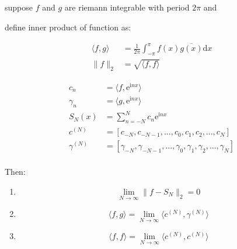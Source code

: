 \begin{thm}
    suppose $f$ and $g$ are riemann integrable with period $2\pi$ and 

    define inner product of function as:

    \begin{align*}
        \langle f, g \rangle &= \frac{1}{2 \pi} \int_{-\pi}^{\pi} f(x) \overline{g(x)} \mathrm{d}x \\
        \| f \|_2 &= \sqrt{\langle f, f \rangle}
    \end{align*}


    \begin{align*}
        c_n &= \langle f, \mathrm{e}^{\mathrm{i}n x} \rangle \\
        \gamma_n &= \langle g, \mathrm{e}^{\mathrm{i}n x} \rangle \\
        S_N(x) &= \sum_{n=-N}^{N} c_n \mathrm{e}^{\mathrm{i}nx} \\
        c^{(N)} &= [c_{-N}, c_{-{N-1}},..., c_0, c_1,c_2,...,c_N] \\
        \gamma^{(N)} &= [\gamma_{-N}, \gamma_{-{N-1}},..., \gamma_0, \gamma_1,\gamma_2,...,\gamma_N] \\
    \end{align*}

    Then:

    \begin{enumerate}
        \item \[
            \lim_{N \to \infty} \| f - S_N \|_2 = 0
        \]

        \item \[
            \langle f, g \rangle  = \lim_{N \to \infty} \langle c^{(N)}, \gamma^{(N)}\rangle
        \]

        \item \[
            \langle f, f\rangle = \lim_{N \to \infty} \langle c^{(N)}, c^{(N)}\rangle
        \]
    \end{enumerate}
\end{thm}


